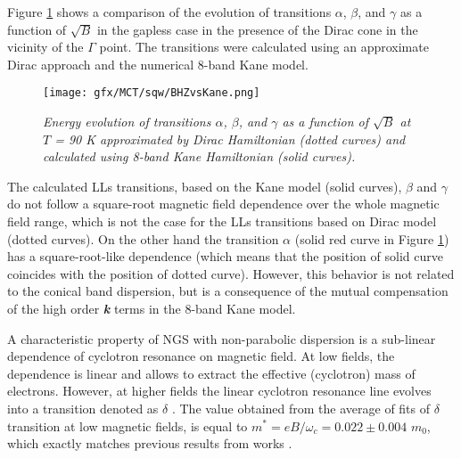 \documentclass[titlepage,a4paper]{book}
\begin{document}
Figure \ref{fig:BHZvsKane} shows a comparison of the evolution of transitions $\alpha$, $\beta$, and $\gamma$ as a function of $\sqrt{B}$ in the gapless case in the presence of the Dirac cone in the vicinity of the $\Gamma$ point. The transitions were calculated using an approximate Dirac approach and the numerical 8-band Kane model. 
 

\begin{figure}[ht]
	\centering
	\texttt{[image: gfx/MCT/sqw/BHZvsKane.png]}
	\vspace{-10pt}
	\caption{\textit{Energy evolution of transitions $\alpha$, $\beta$, and $\gamma$ as a function of $\sqrt{B}$ at $T$ = 90 K approximated by Dirac Hamiltonian (dotted curves) and calculated using 8-band Kane Hamiltonian (solid curves).}}
	\label{fig:BHZvsKane}
\end{figure}

The calculated LLs transitions, based on the Kane model (solid curves), $\beta$ and $\gamma$ do not follow a square-root magnetic field dependence over the whole magnetic field range, which is not the case for the LLs transitions based on Dirac model (dotted curves). On the other hand the transition $\alpha$ (solid red curve in Figure \ref{fig:BHZvsKane}) has a square-root-like dependence (which means that the position of solid curve coincides with the position of dotted curve). However, this behavior is not related to the conical band dispersion, but is a consequence of the mutual compensation of the high order \textbf{\textit{k}} terms in the 8-band Kane model.

A characteristic property of NGS with non-parabolic dispersion is a sub-linear dependence of cyclotron resonance on magnetic field. At low fields, the dependence is linear and allows to extract the effective (cyclotron) mass of electrons. However, at higher fields the linear cyclotron resonance line evolves into a transition denoted as $\delta$ \cite{Orlita_MCT_QW}. The value obtained from the average of fits of $\delta$ transition at low magnetic fields, is equal to $m^* = eB/\omega_c = 0.022 \pm 0.004$ $m_0$, which exactly matches previous results from works \cite{Orlita_MCT_QW}\cite{Zholudev_MCT_QW}. 
\end{document}
